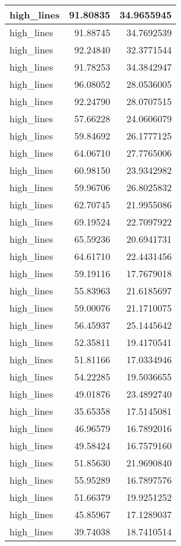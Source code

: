 \documentclass[
]{book}
\theoremstyle{definition}
\theoremstyle{definition}
\theoremstyle{definition}
\theoremstyle{definition}
\theoremstyle{remark}
\begin{document}
\begin{tabular}{l|r|r}
\hline
high\_lines & 91.80835 & 34.9655945\\
\hline
high\_lines & 91.88745 & 34.7692539\\
\hline
high\_lines & 92.24840 & 32.3771544\\
\hline
high\_lines & 91.78253 & 34.3842947\\
\hline
high\_lines & 96.08052 & 28.0536005\\
\hline
high\_lines & 92.24790 & 28.0707515\\
\hline
high\_lines & 57.66228 & 24.0606079\\
\hline
high\_lines & 59.84692 & 26.1777125\\
\hline
high\_lines & 64.06710 & 27.7765006\\
\hline
high\_lines & 60.98150 & 23.9342982\\
\hline
high\_lines & 59.96706 & 26.8025832\\
\hline
high\_lines & 62.70745 & 21.9955086\\
\hline
high\_lines & 69.19524 & 22.7097922\\
\hline
high\_lines & 65.59236 & 20.6941731\\
\hline
high\_lines & 64.61710 & 22.4431456\\
\hline
high\_lines & 59.19116 & 17.7679018\\
\hline
high\_lines & 55.83963 & 21.6185697\\
\hline
high\_lines & 59.00076 & 21.1710075\\
\hline
high\_lines & 56.45937 & 25.1445642\\
\hline
high\_lines & 52.35811 & 19.4170541\\
\hline
high\_lines & 51.81166 & 17.0334946\\
\hline
high\_lines & 54.22285 & 19.5036655\\
\hline
high\_lines & 49.01876 & 23.4892740\\
\hline
high\_lines & 35.65358 & 17.5145081\\
\hline
high\_lines & 46.96579 & 16.7892016\\
\hline
high\_lines & 49.58424 & 16.7579160\\
\hline
high\_lines & 51.85630 & 21.9690840\\
\hline
high\_lines & 55.95289 & 16.7897576\\
\hline
high\_lines & 51.66379 & 19.9251252\\
\hline
high\_lines & 45.85967 & 17.1289037\\
\hline
high\_lines & 39.74038 & 18.7410514\\

\end{tabular}
\end{document}
